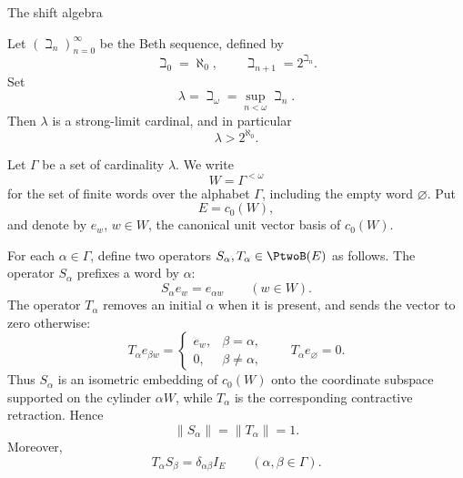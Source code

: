 \documentclass[11pt,reqno]{amsart}
\makeatletter
\theoremstyle{plain}
\theoremstyle{definition}
\newcounter{problempaper}
\newenvironment{problempaperbody}{%
  \setcounter{subsection}{0}%
  \setcounter{subsubsection}{0}%
  \setcounter{paragraph}{0}%
  \renewcommand{\thesubsection}{\arabic{subsection}}%
  \renewcommand{\thesubsubsection}{\thesubsection.\arabic{subsubsection}}%
  \renewcommand{\theparagraph}{\thesubsubsection.\arabic{paragraph}}%
  \let\problem@outersection\section
  \let\problem@outersubsection\subsection
  \let\problem@outersubsubsection\subsubsection
  \let\problem@outerparagraph\paragraph
  \let\section\problem@papersection
  \let\subsection\problem@papersubsection
  \let\subsubsection\problem@papersubsubsection
}{%
  \let\section\problem@outersection
  \let\subsection\problem@outersubsection
  \let\subsubsection\problem@outersubsubsection
  \let\paragraph\problem@outerparagraph
}
\newcommand{\problem@target}[2]{%
  \hypertarget{problem-\theproblempaper-#1-#2}{}%
}
\newcommand{\problem@paperheading}[3]{%
  \par\bigskip
  \problem@target{#1}{#2}%
  \noindent{\large\bfseries #2.\quad #3\par}%
  \nobreak\smallskip
}
\newcommand{\problem@papersubheading}[3]{%
  \par\medskip
  \problem@target{#1}{#2}%
  \noindent{\normalsize\bfseries #2.\quad #3\par}%
  \nobreak\smallskip
}
\newcommand{\problem@papersubsubheading}[3]{%
  \par\smallskip
  \problem@target{#1}{#2}%
  \noindent{\normalsize\itshape #2.\quad #3.\ }%
}
\def\problem@papersection{%
  \@ifstar{\problem@papersectionstar}{\problem@papersectionnostar}%
}
\def\problem@papersectionstar#1{%
  \par\bigskip\noindent{\large\bfseries #1\par}\nobreak\smallskip
}
\def\problem@papersectionnostar#1{%
  \refstepcounter{subsection}%
  \setcounter{subsubsection}{0}%
  \setcounter{paragraph}{0}%
  \problem@paperheading{section}{\thesubsection}{#1}%
  \problem@writecontentsline{section}{\thesubsection}{#1}%
}
\def\problem@papersubsection{%
  \@ifstar{\problem@papersubsectionstar}{\problem@papersubsectionnostar}%
}
\def\problem@papersubsectionstar#1{%
  \par\medskip\noindent{\normalsize\bfseries #1\par}\nobreak\smallskip
}
\def\problem@papersubsectionnostar#1{%
  \refstepcounter{subsubsection}%
  \setcounter{paragraph}{0}%
  \problem@papersubheading{subsection}{\thesubsubsection}{#1}%
  \problem@writecontentsline{subsection}{\thesubsubsection}{#1}%
}
\def\problem@papersubsubsection{%
  \@ifstar{\problem@papersubsubsectionstar}{\problem@papersubsubsectionnostar}%
}
\def\problem@papersubsubsectionstar#1{%
  \par\smallskip\noindent{\normalsize\itshape #1.\ }%
}
\def\problem@papersubsubsectionnostar#1{%
  \refstepcounter{paragraph}%
  \problem@papersubsubheading{subsubsection}{\theparagraph}{#1}%
  \problem@writecontentsline{subsubsection}{\theparagraph}{#1}%
}
\newcommand{\problem@writecontentsline}[3]{%
  \begingroup
  \protected@write\@auxout{}{%
    \string\problemcontentsentry{\theproblempaper}{#1}{#2}{#3}{\thepage}%
  }%
  \endgroup
}
\newcommand{\problemcontentsentry}[5]{%
  \@ifundefined{problemcontents@#1}{%
    \expandafter\gdef\csname problemcontents@#1\endcsname{}%
  }{}%
  \expandafter\g@addto@macro\csname problemcontents@#1\endcsname{%
    \problemcontentsline{#1}{#2}{#3}{#4}{#5}%
  }%
}
\newcommand{\problemcontentslink}[4]{%
  \hyperlink{problem-#1-#2-#3}{#4}%
}
\newcommand{\problemcontentsline}[5]{%
  \ifstrequal{#2}{section}{%
    \par\noindent
    \problemcontentslink{#1}{#2}{#3}{\makebox[2.5em][l]{#3}#4}%
    \nobreak\dotfill
    \problemcontentslink{#1}{#2}{#3}{#5}\par
  }{%
    \ifstrequal{#2}{subsection}{%
      \par\noindent\hspace*{1.5em}%
      \problemcontentslink{#1}{#2}{#3}{\makebox[3.5em][l]{#3}#4}%
      \nobreak\dotfill
      \problemcontentslink{#1}{#2}{#3}{#5}\par
    }{%
      \par\noindent\hspace*{3em}%
      \problemcontentslink{#1}{#2}{#3}{\makebox[4.5em][l]{#3}#4}%
      \nobreak\dotfill
      \problemcontentslink{#1}{#2}{#3}{#5}\par
    }%
  }%
}
\makeatother
\begin{document}
\begin{problempaperbody}
\subsection{The shift algebra}
\label{p2-second:sec:shift-algebra}

Let $(\beth_n)_{n=0}^{\infty}$ be the Beth sequence, defined by
\begin{equation*}
        \beth_0=\aleph_0, \qquad \beth_{n+1}=2^{\beth_n}.
\end{equation*}
Set
\begin{equation*}
        \lambda=\beth_\omega=\sup_{n<\omega}\beth_n.
\end{equation*}
Then $\lambda$ is a strong-limit cardinal, and in particular
\begin{equation*}
        \lambda>2^{\aleph_0}.
\end{equation*}

Let $\Gamma$ be a set of cardinality $\lambda$. We write
\begin{equation*}
        W=\Gamma^{<\omega}
\end{equation*}
for the set of finite words over the alphabet $\Gamma$, including the empty word $\varnothing$. Put
\begin{equation*}
        E=c_0(W),
\end{equation*}
and denote by $e_w$, $w\in W$, the canonical unit vector basis of $c_0(W)$.

For each $\alpha\in\Gamma$, define two operators $S_\alpha,T_\alpha\in\PtwoB(E)$ as follows. The operator $S_\alpha$ prefixes a word by $\alpha$:
\begin{equation*}
        S_\alpha e_w=e_{\alpha w} \qquad(w\in W).
\end{equation*}
The operator $T_\alpha$ removes an initial $\alpha$ when it is present, and sends the vector to zero otherwise:
\begin{equation*}
        T_\alpha e_{\beta w}=
        \begin{cases}
        e_w, & \beta=\alpha,\\
        0, & \beta\ne\alpha,
        \end{cases}
        \qquad
        T_\alpha e_\varnothing=0.
\end{equation*}
Thus $S_\alpha$ is an isometric embedding of $c_0(W)$ onto the coordinate subspace supported on the cylinder $\alpha W$, while $T_\alpha$ is the corresponding contractive retraction. Hence
\begin{equation*}
        \|S_\alpha\|=\|T_\alpha\|=1.
\end{equation*}
Moreover,
\begin{equation*}
        T_\alpha S_\beta=\delta_{\alpha\beta}I_E \qquad(\alpha,\beta\in\Gamma).
\end{equation*}


\end{problempaperbody}
\end{document}
